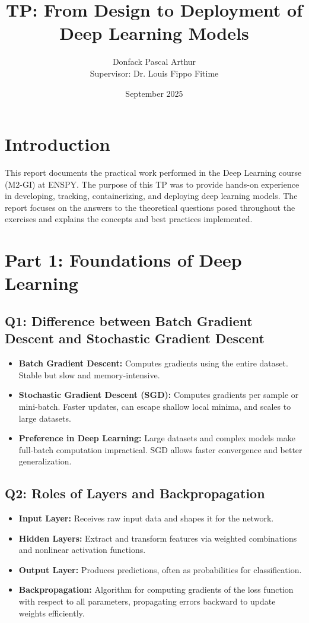 \documentclass{article}
\title{TP: From Design to Deployment of Deep Learning Models}
\author{Donfack Pascal Arthur \\ Supervisor: Dr. Louis Fippo Fitime}
\date{September 2025}
\begin{document}
\maketitle

\section{Introduction}
This report documents the practical work performed in the Deep Learning course (M2-GI) at ENSPY. The purpose of this TP was to provide hands-on experience in developing, tracking, containerizing, and deploying deep learning models. The report focuses on the answers to the theoretical questions posed throughout the exercises and explains the concepts and best practices implemented.

\section{Part 1: Foundations of Deep Learning}

\subsection{Q1: Difference between Batch Gradient Descent and Stochastic Gradient Descent}
\begin{itemize}[leftmargin=*]
    \item \textbf{Batch Gradient Descent:} Computes gradients using the entire dataset. Stable but slow and memory-intensive.
    \item \textbf{Stochastic Gradient Descent (SGD):} Computes gradients per sample or mini-batch. Faster updates, can escape shallow local minima, and scales to large datasets.
    \item \textbf{Preference in Deep Learning:} Large datasets and complex models make full-batch computation impractical. SGD allows faster convergence and better generalization.
\end{itemize}

\subsection{Q2: Roles of Layers and Backpropagation}
\begin{itemize}[leftmargin=*]
    \item \textbf{Input Layer:} Receives raw input data and shapes it for the network.
    \item \textbf{Hidden Layers:} Extract and transform features via weighted combinations and nonlinear activation functions.
    \item \textbf{Output Layer:} Produces predictions, often as probabilities for classification.
    \item \textbf{Backpropagation:} Algorithm for computing gradients of the loss function with respect to all parameters, propagating errors backward to update weights efficiently.
\end{itemize}
\end{document}
